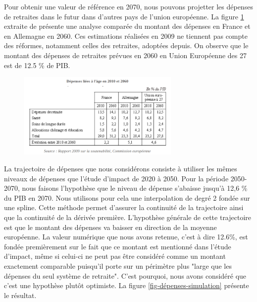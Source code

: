 \documentclass[10pt]{article}
\begin{document}
Pour obtenir une valeur de référence en 2070, nous pouvons projetter les dépenses de 
retraites dans le futur dans d'autres pays de l'union européenne.  
La figure \ref{fig-depenses-France-Allemagne} extraite 
de \cite{ProspectiveSenat} présente une analyse 
comparée du montant des dépenses en France et en Allemagne en 2060. 
Ces estimations réalisées en 2009 ne tiennent pas compte des réformes, 
notamment celles des retraites, adoptées depuis. 
On observe que le montant des dépenses de retraites prévues en 2060 
en Union Européenne des 27 est de 12.5 \% de PIB.

\begin{figure}
\begin{center}
\includegraphics[width=0.7\textwidth]{Depenses-retraites-2010-2060-France-Allemagne.png}
\end{center}
\caption{}
\label{fig-depenses-France-Allemagne}
\end{figure}

La trajectoire de dépenses que nous considérons consiste à utiliser les mêmes 
niveaux de dépenses que l'étude d'impact de 2020 à 2050. 
Pour la période 2050-2070, nous faisons l'hypothèse que le niveau 
de dépense s'abaisse jusqu'à 12,6 \% du PIB en 2070. 
Nous utilisons pour cela une interpolation de degré 2 fondée sur une spline. 
Cette méthode permet d'assurer la continuité de la trajectoire ainsi que la continuité 
de la dérivée première. 
L'hypothèse générale de cette trajectoire est que le montant des dépenses 
va baisser en direction de la moyenne européenne. 
La valeur numérique que nous avons retenue, c'est à dire 12.6\%, est fondée premièrement 
sur le fait que ce montant est mentionné dans l'étude d'impact, même si celui-ci ne peut pas 
être considéré comme un montant exactement comparable puisqu'il porte 
sur un périmètre plus "large que les dépenses du seul système de retraite". 
C'est pourquoi, nous avons considéré que c'est une hypothèse plutôt optimiste. 
La figure \ref{fig-dépenses-simulation} présente le résultat. 
\end{document}
